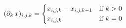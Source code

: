 \begin{describe}
\begin{center}
                    \end{center}
                    \begin{center}
                        \begin{minipage}{0.5\textwidth}
                            \[
                                (\partial_{k}\,x)_{i, j, k} =
                                    \begin{dcases*}
                                        x_{i, j, k} - x_{i, j, k-1} & \textnormal{if $k > 0$}\\
                                        x_{i, j, k} & \textnormal{if $k = 0$}
                                    \end{dcases*}
                            \]
                        \end{minipage}
                    \end{center}
                \end{describe}
